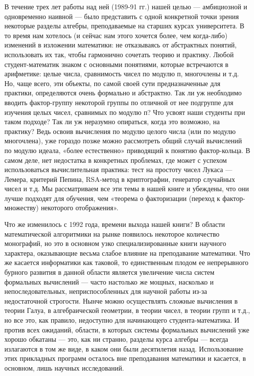 \documentclass{mai_book}
\begin{document}
{{   В течение трех лет работы над ней (1989-91 гг.) нашей целью — амбициозной и одновременно наивной — было представить с одной конкретной точки зрения некоторые разделы алгебры, преподаваемые на старших курсах университета. В то время нам хотелось (и сейчас нам этого хочется более, чем когда-либо) изменений в изложении математики: не отказываясь от абстрактных понятий, использовать их так, чтобы гармонично сочетать теорию и практику.
\newpage
{}
   Любой студент-математик знаком с основными понятиями, которые встречаются в арифметике: целые числа, сравнимость чисел по модулю п, многочлены и т.д. Но, чаще всего, эти объекты, по самой своей сути предназначенные для практики, определяются очень формально и абстрактно. Так ли уж необходимо вводить фактор-группу некоторой группы по отличной от нее подгруппе для изучения целых чисел, сравнимых по модулю п? Что усвоят наши студенты при таком подходе? Так ли уж неразумно опираться, когда это возможно, на практику? Ведь освоив вычисления по модулю целого числа (или по модулю многочлена), уже гораздо позже можно рассмотреть общий случай вычислений по модулю идеала, «более естественно» приводящий к понятию фактор-кольца. В самом деле, нет недостатка в конкретных проблемах, где может с успехом использоваться вычислительная практика: тест на простоту чисел Лукаса — Лемера, критерий Пепина, RSA-метод в криптографии, генератор случайных чисел и т.д. Мы рассматриваем все эти темы в нашей книге и убеждены, что они лучше подходят для обучения, чем «теорема о факторизации (переход к фактор-множеству) некоторого отображения».

   Что же изменилось с 1992 года, времени выхода нашей книги? В области математической алгоритмики на рынке появилось некоторое количество монографий, но это в основном узко специализированные книги научного характера, оказывающие весьма слабое влияние на преподавание математики. Что же касается информатики как таковой, то единственным плодом ее непрерывного бурного развития в данной области является увеличение числа систем формальных вычислений — часто настолько же мощных, насколько и непоследовательных, неприспособленных для научной работы из-за недостаточной строгости. Нынче можно осуществлять сложные вычисления в теории Галуа, в алгебраической геометрии, в теории чисел, в теории групп и т.д., но все это, как правило, недоступно для начинающего студента-математика. И против всех ожиданий, области, в которых системы формальных вычислений уже хорошо обкатаны — это, как ни странно, разделы курса алгебры — всегда излагаются в том же виде, в каком они были десятилетия назад. Использование этих прикладных программ осталось вне преподавания математики и касается, в основном, лишь научных исследований.

}}
\end{document}
